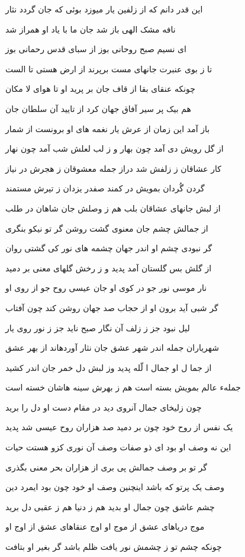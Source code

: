 اين قدر دانم که از زلفين يار
ميوزد بوئى که جان گردد نثار

نافه مشک الهى باز شد
جان ما با ياد او همراز شد

اى نسيم صبح روحانى بوز
از سباى قدس رحمانى بوز

تا ز بوى عنبرت جانهاى مست
برپرند از ارض هستى تا الست

چونکه عنقاى بقا از قاف جان
بر پريد او تا هواى لا مکان

هم بيک پر سير آفاق جهان
کرد از تاييد آن سلطان جان

باز آمد اين زمان از عرش يار
نغمه هاى او برونست از شمار

از گل رويش دى آمد چون بهار
و ز لب لعلش شب آمد چون نهار

کار عشاقان ز زلفش شد دراز
جمله معشوقان ز هجرش در نياز

گردن گُردان بمويش در کمند
صفدر يزدان ز تيرش مستمند

از لبش جانهاى عشاقان بلب
هم ز وصلش جان شاهان در طلب

از جمالش چشم جان معنوى
گشت روشن گر تو نيکو بنگرى

گر نبودى چشم او اندر جهان
چشمه هاى نور کى گشتى روان

از گلش بس گلستان آمد پديد
و ز رخش گلهاى معنى بر دميد

نار موسى نور جو در کوى او
جان عيسى روح جو از روى او

گر شبى آيد برون او از حجاب
صد جهان روشن کند چون آفتاب

ليل نبود جز ز زلف آن نگار
صبح نايد جز ز نور روى يار

شهرياران جمله اندر شهر عشق
جان نثار آوردهاند از بهر عشق

از جما ل او جمال ا لّله پديد
وز لبش دل خمر جان اندر کشيد

جملهء عالم بمويش بسته است
هم ز بهرش سينه هاشان خسته است

چون زليخاى جمال آنروى ديد
در مقام دست او دل را بريد

يک نفس از روح خود چون بر دميد
صد هزاران روح عيسى شد پديد

اين نه وصف او بود اى ذو صفات
وصف آن نورى کزو هستت حيات

گر تو بر وصف جمالش پى برى
از هزاران بحر معنى بگذرى

وصف يک پرتو که باشد اينچنين
وصف او خود چون بود ايمرد دين

چشم عاشق چون جمال او بديد
هم ز دنيا هم ز عقبى دل بريد

موج درياهاى عشق از موج او
اوج عنقاهاى عشق از اوج او

چونکه چشم تو ز چشمش نور يافت
ظلم باشد گر بغير او بتافت

